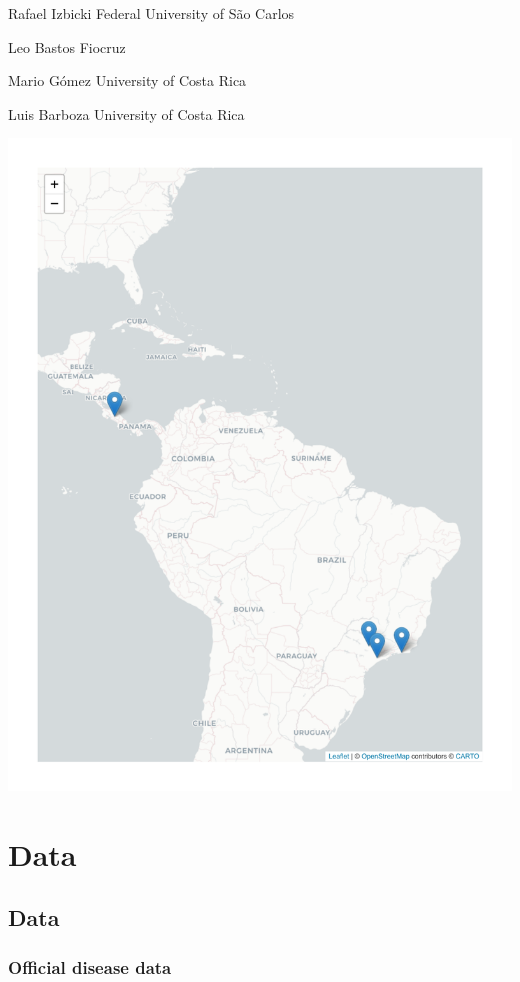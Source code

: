 \documentclass[
  letterpaper,
  DIV=11,
  numbers=noendperiod]{scrreprt}
\begin{document}
Rafael Izbicki Federal University of São Carlos

Leo Bastos Fiocruz

Mario Gómez University of Costa Rica

Luis Barboza University of Costa Rica

\includegraphics{01-people_files/figure-pdf/unnamed-chunk-1-1.pdf}

\part{Data}

\hypertarget{data-1}{%
\chapter{Data}\label{data-1}}

\hypertarget{official-disease-data}{%
\section{Official disease data}\label{official-disease-data}}
\end{document}
